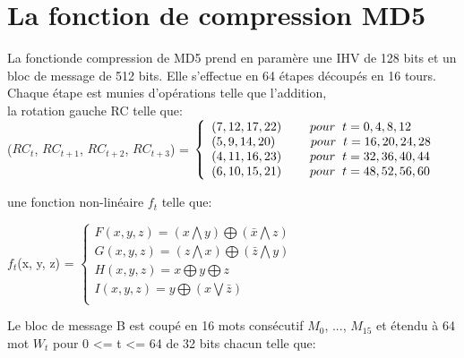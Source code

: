 \documentclass[a4paper,11pt,french]{article}
\begin{document}
\section{La fonction de compression MD5}
La fonctionde compression de MD5 prend en paramère une IHV de 128 bits et un bloc de message de 512 bits. Elle s'effectue en 64 étapes découpés en 16 tours. Chaque étape est munies d'opérations telle que l'addition,\\
la rotation gauche RC telle que:\\
\vspace{.5cm}
($RC_{t}$, $RC_{t+1}$, $RC_{t+2}$, $RC_{t+3}$) =
$\left\{
\begin{array}{l}
  (7, 12, 17, 22)   \hspace{.8cm}pour \hspace{.2cm} t = 0, 4, 8, 12 \\
  (5, 9, 14, 20)  \hspace{1cm}pour \hspace{.2cm} t = 16, 20, 24, 28 \\
  (4, 11, 16, 23)  \hspace{.8cm}pour \hspace{.2cm} t = 32, 36, 40, 44 \\
  (6, 10, 15, 21)  \hspace{.8cm}pour \hspace{.2cm} t = 48, 52, 56, 60 \\
\end{array}
\right.$
\vspace{.5cm}

une fonction non-linéaire $f_{t}$ telle que:\\
\vspace{.5cm}

$f_{t}$(x, y, z) =
$\left\{
\begin{array}{l}
  F(x, y, z) = (x  \bigwedge y) \bigoplus (\bar x \bigwedge z) \\
  G(x, y, z) = (z  \bigwedge x) \bigoplus (\bar z \bigwedge y) \\
  H(x, y, z) = x \bigoplus y \bigoplus z \\
  I(x, y, z) = y \bigoplus (x \bigvee \bar z) \\
\end{array}
\right.$
\vspace{.5cm}

Le bloc de message B est coupé en 16 mots consécutif $M_{0}$, ..., $M_{15}$ et étendu à 64 mot $W_{t}$ pour 0 <= t <= 64 de 32 bits chacun telle que:
\vspace{.5cm}
\end{document}
